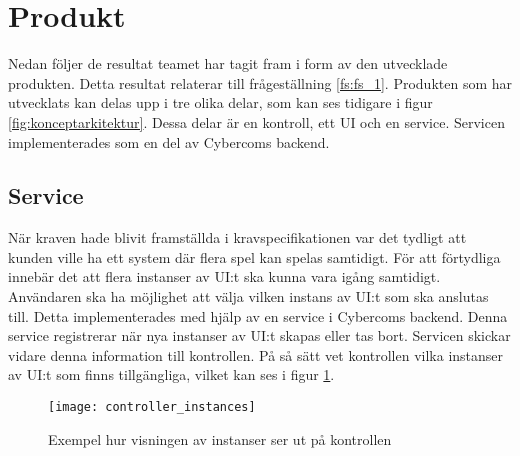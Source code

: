 \section{Produkt}
\label{sec:produkt}
Nedan följer de resultat teamet har tagit fram i form av den utvecklade produkten. Detta resultat relaterar till frågeställning \ref{fs:fs_1}. Produkten som har utvecklats kan delas upp i tre olika delar, som kan ses tidigare i figur \ref{fig:konceptarkitektur}. Dessa delar är en kontroll, ett UI och en service. Servicen implementerades som en del av Cybercoms backend.

\subsection{Service}
När kraven hade blivit framställda i kravspecifikationen var det tydligt att kunden ville ha ett system där flera spel kan spelas samtidigt. För att förtydliga innebär det att flera instanser av UI:t ska kunna vara igång samtidigt. Användaren ska ha möjlighet att välja vilken instans av UI:t som ska anslutas till. Detta implementerades med hjälp av en service i Cybercoms backend. Denna service registrerar när nya instanser av UI:t skapas eller tas bort. Servicen skickar vidare denna information till kontrollen. På så sätt vet kontrollen vilka instanser av UI:t som finns tillgängliga, vilket kan ses i figur \ref{fig:controller_instances}.

\begin{figure}[h]
    \centering
    \texttt{[image: controller\_instances]}
    \caption{Exempel hur visningen av instanser ser ut på kontrollen}
    \label{fig:controller_instances}
\end{figure}

\pagebreak

